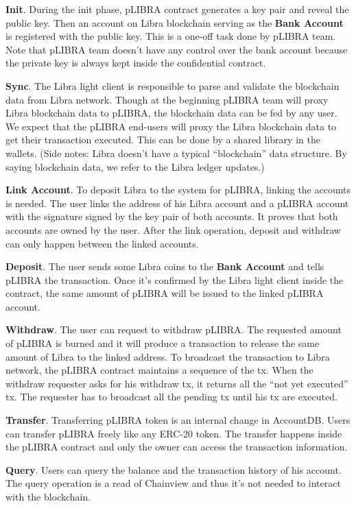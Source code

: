\begin{icompact}
    \item \textbf{Init}. During the init phase, pLIBRA contract generates a key pair and reveal the public key. Then an account on Libra blockchain serving as the \textbf{Bank Account} is registered with the public key. This is a one-off task done by pLIBRA team. Note that pLIBRA team doesn't have any control over the bank account because the private key is always kept inside the confidential contract.
    \item \textbf{Sync}. The Libra light client is responsible to parse and validate the blockchain data from Libra network. Though at the beginning pLIBRA team will proxy Libra blockchain data to pLIBRA, the blockchain data can be fed by any user. We expect that the pLIBRA end-users will proxy the Libra blockchain data to get their transaction executed. This can be done by a shared library in the wallets. (Side notes: Libra doesn't have a typical ``blockchain'' data structure. By saying blockchain data, we refer to the Libra ledger updates.)
    \item \textbf{Link Account}. To deposit Libra to the system for pLIBRA, linking the accounts is needed. The user links the address of his Libra account and a pLIBRA account with the signature signed by the key pair of both accounts. It proves that both accounts are owned by the user. After the link operation, deposit and withdraw can only happen between the linked accounts.
    \item \textbf{Deposit}. The user sends some Libra coins to the \textbf{Bank Account} and tells pLIBRA the transaction. Once it's confirmed by the Libra light client inside the contract, the same amount of pLIBRA will be issued to the linked pLIBRA account.
    \item \textbf{Withdraw}. The user can request to withdraw pLIBRA. The requested amount of pLIBRA is burned and it will produce a transaction to release the same amount of Libra to the linked address. To broadcast the transaction to Libra network, the pLIBRA contract maintains a sequence of the tx. When the withdraw requester asks for his withdraw tx, it returns all the ``not yet executed'' tx. The requester has to broadcast all the pending tx until his tx are executed.
    \item \textbf{Transfer}. Transferring pLIBRA token is an internal change in AccountDB. Users can transfer pLIBRA freely like any ERC-20 token. The transfer happens inside the pLIBRA contract and only the owner can access the transaction information.
    \item \textbf{Query}. Users can query the balance and the transaction history of his account. The query operation is a read of Chainview and thus it's not needed to interact with the blockchain.
\end{icompact}
